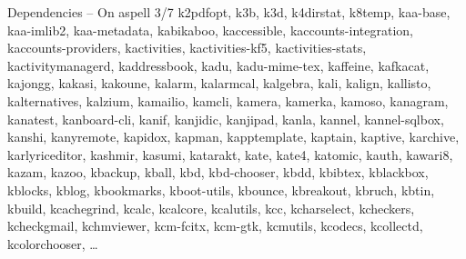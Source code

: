 \documentclass{beamer}
\begin{document}
\begin{frame}{Dependencies – On aspell 3/7}
k2pdfopt, k3b, k3d, k4dirstat, k8temp, kaa-base, kaa-imlib2, kaa-metadata, kabikaboo, kaccessible, kaccounts-integration, kaccounts-providers, kactivities, kactivities-kf5, kactivities-stats, kactivitymanagerd, kaddressbook, kadu, kadu-mime-tex, kaffeine, kafkacat, kajongg, kakasi, kakoune, kalarm, kalarmcal, kalgebra, kali, kalign, kallisto, kalternatives, kalzium, kamailio, kamcli, kamera, kamerka, kamoso, kanagram, kanatest, kanboard-cli, kanif, kanjidic, kanjipad, kanla, kannel, kannel-sqlbox, kanshi, kanyremote, kapidox, kapman, kapptemplate, kaptain, kaptive, karchive, karlyriceditor, kashmir, kasumi, katarakt, kate, kate4, katomic, kauth, kawari8, kazam, kazoo, kbackup, kball, kbd, kbd-chooser, kbdd, kbibtex, kblackbox, kblocks, kblog, kbookmarks, kboot-utils, kbounce, kbreakout, kbruch, kbtin, kbuild, kcachegrind, kcalc, kcalcore, kcalutils, kcc, kcharselect, kcheckers, kcheckgmail, kchmviewer, kcm-fcitx, kcm-gtk, kcmutils, kcodecs, kcollectd, kcolorchooser, …
\end{frame}
\end{document}
